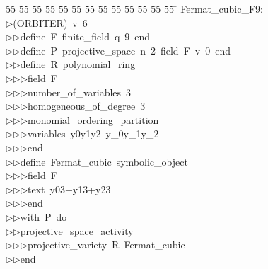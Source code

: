 %
%
\begin{tabbing}
55 \= 55 \= 55 \= 55 \= 55 \= 55 \= 55 \= 55 \= 55 \= 55 \= 55 \= 55 \= 55 \= \kill
Fermat\_cubic\_F9:\\[0pt]
$\triangleright$\>(ORBITER)\ v\ 6\ \\[0pt]
$\triangleright$\>$\triangleright$\>define\ F\ finite\_field\ q\ 9\ end\ \\[0pt]
$\triangleright$\>$\triangleright$\>define\ P\ projective\_space\ n\ 2\ field\ F\ v\ 0\ end\ \\[0pt]
$\triangleright$\>$\triangleright$\>define\ R\ polynomial\_ring\ \\[0pt]
$\triangleright$\>$\triangleright$\>$\triangleright$\>field\ F\ \\[0pt]
$\triangleright$\>$\triangleright$\>$\triangleright$\>number\_of\_variables\ 3\ \\[0pt]
$\triangleright$\>$\triangleright$\>$\triangleright$\>homogeneous\_of\_degree\ 3\ \\[0pt]
$\triangleright$\>$\triangleright$\>$\triangleright$\>monomial\_ordering\_partition\ \\[0pt]
$\triangleright$\>$\triangleright$\>$\triangleright$\>variables\ y0y1y2\ y\_0y\_1y\_2\ \\[0pt]
$\triangleright$\>$\triangleright$\>$\triangleright$\>end\ \\[0pt]
$\triangleright$\>$\triangleright$\>define\ Fermat\_cubic\ symbolic\_object\ \\[0pt]
$\triangleright$\>$\triangleright$\>$\triangleright$\>field\ F\ \\[0pt]
$\triangleright$\>$\triangleright$\>$\triangleright$\>text\ y03+y13+y23\ \\[0pt]
$\triangleright$\>$\triangleright$\>$\triangleright$\>end\ \\[0pt]
$\triangleright$\>$\triangleright$\>with\ P\ do\ \\[0pt]
$\triangleright$\>$\triangleright$\>projective\_space\_activity\ \\[0pt]
$\triangleright$\>$\triangleright$\>$\triangleright$\>projective\_variety\ R\ Fermat\_cubic\ \ \\[0pt]
$\triangleright$\>$\triangleright$\>end\\[0pt]
\end{tabbing}
